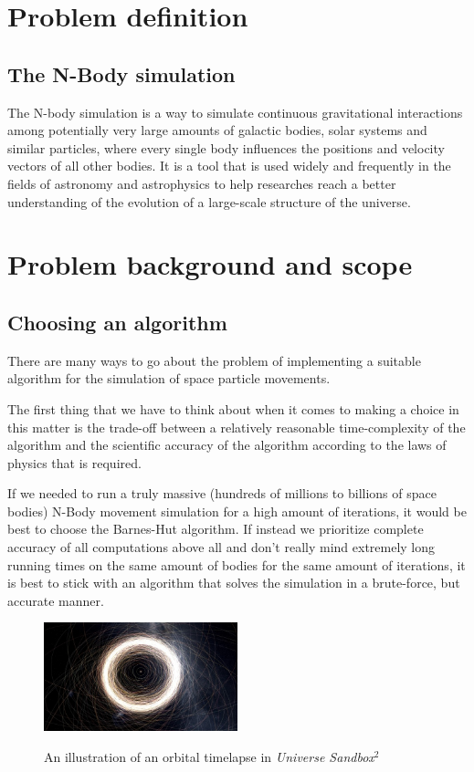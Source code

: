 \documentclass[journal]{IEEEtran}
\begin{document}
	\section{Problem definition}
	
	\subsection*{The N-Body simulation}
	
		The N-body simulation is a way to simulate continuous gravitational interactions among potentially very large amounts of galactic bodies, solar systems and similar particles, where every single body influences the positions and velocity vectors of all other bodies. It is a tool that is used widely and frequently in the fields of astronomy and astrophysics to help researches reach a better understanding of the evolution of a large-scale structure of the universe.\cite{scholarpedia}
		
	\newpage
	
	\section{Problem background and scope}
	\label{algs}
	
		\subsection*{Choosing an algorithm}
	
			There are many ways to go about the problem of implementing a suitable algorithm for the simulation of space particle movements. 
			
			The first thing that we have to think about when it comes to making a choice in this matter is the trade-off between a relatively reasonable time-complexity of the algorithm and the scientific accuracy of the algorithm according to the laws of physics that is required.
			
			If we needed to run a truly massive (hundreds of millions to billions of space bodies) N-Body movement simulation for a high amount of iterations, it would be best to choose the Barnes-Hut algorithm. If instead we prioritize complete accuracy of all computations above all and don't really mind extremely long running times on the same amount of bodies for the same amount of iterations, it is best to stick with an algorithm that solves the simulation in a brute-force, but accurate manner.
	
	\begin{figure}[ht]
		\centering
		\includegraphics[width=0.5\textwidth]{sandbox2.jpg}
		\caption{An illustration of an orbital timelapse in \textit{Universe Sandbox$^2$}}
		\cite{nbodypic}
	\end{figure} 
	
\end{document}
